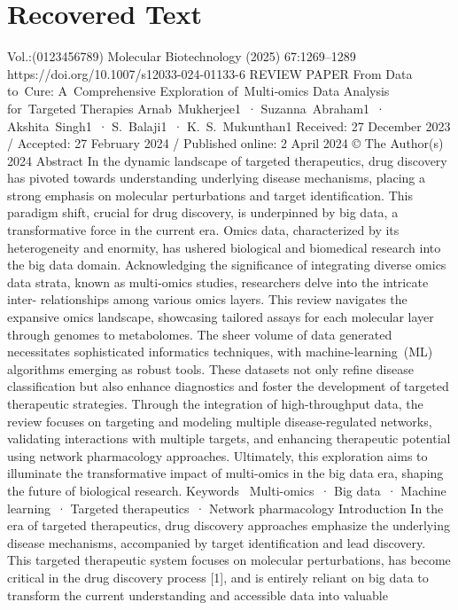 \section{Recovered Text}
Vol.:(0123456789)
Molecular Biotechnology (2025) 67:1269–1289
https://doi.org/10.1007/s12033-024-01133-6
REVIEW PAPER
From Data to Cure: A Comprehensive Exploration of Multi‑omics Data
Analysis for Targeted Therapies
Arnab Mukherjee1 · Suzanna Abraham1 · Akshita Singh1 · S. Balaji1 · K. S. Mukunthan1
Received: 27 December 2023 / Accepted: 27 February 2024 / Published online: 2 April 2024
© The Author(s) 2024
Abstract
In the dynamic landscape of targeted therapeutics, drug discovery has pivoted towards understanding underlying disease
mechanisms, placing a strong emphasis on molecular perturbations and target identification. This paradigm shift, crucial
for drug discovery, is underpinned by big data, a transformative force in the current era. Omics data, characterized by its
heterogeneity and enormity, has ushered biological and biomedical research into the big data domain. Acknowledging the
significance of integrating diverse omics data strata, known as multi-omics studies, researchers delve into the intricate inter-
relationships among various omics layers. This review navigates the expansive omics landscape, showcasing tailored assays
for each molecular layer through genomes to metabolomes. The sheer volume of data generated necessitates sophisticated
informatics techniques, with machine-learning (ML) algorithms emerging as robust tools. These datasets not only refine
disease classification but also enhance diagnostics and foster the development of targeted therapeutic strategies. Through
the integration of high-throughput data, the review focuses on targeting and modeling multiple disease-regulated networks,
validating interactions with multiple targets, and enhancing therapeutic potential using network pharmacology approaches.
Ultimately, this exploration aims to illuminate the transformative impact of multi-omics in the big data era, shaping the
future of biological research.
Keywords  Multi-omics · Big data · Machine learning · Targeted therapeutics · Network pharmacology
Introduction
In the era of targeted therapeutics, drug discovery
approaches emphasize the underlying disease mechanisms,
accompanied by target identification and lead discovery.
This targeted therapeutic system focuses on molecular
perturbations, has become critical in the drug discovery
process [1], and is entirely reliant on big data to transform
the current understanding and accessible data into valuable
